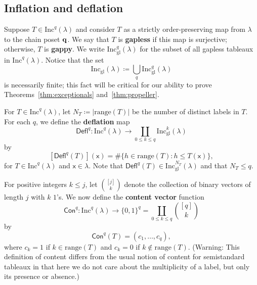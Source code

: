 \documentclass[12pt]{amsart}
\newcommand{\x}{\ensuremath{\mathsf{x}}}
\theoremstyle{definition}
\theoremstyle{remark}
\numberwithin{equation}{section}
\newcommand{\inc}{\ensuremath{\mathrm{Inc}}}
\newcommand{\incgl}{\inc_{\mathrm{gl}}}
\newcommand{\deflate}{\ensuremath{\mathsf{Defl}}}
\newcommand{\content}{\ensuremath{\mathsf{Con}}}
\begin{document}
\subsection{Inflation and deflation}
Suppose $T \in \inc^q(\lambda)$ and consider $T$ as a strictly order-preserving map from $\lambda$ to the chain poset ${\bf q}$. We say that $T$ is {\bf gapless} if this map is surjective; otherwise, $T$ is {\bf gappy}. We write $\incgl^q(\lambda)$ for the subset of all gapless tableaux in $\inc^q(\lambda)$. Notice that the set 
\[
\incgl(\lambda) \coloneqq \bigcup_{q} \incgl^q(\lambda)
\]
is necessarily finite; this fact will be critical for our ability to prove Theorems~\ref{thm:exceptionals} and~\ref{thm:propeller}.

For $T \in \inc^q(\lambda)$, let $N_T \coloneqq |\mathrm{range}(T)|$ be the number of distinct labels in $T$. For each $q$, we define the {\bf deflation} map \[\deflate^q : \inc^q(\lambda) \to \coprod_{0 \leq k \leq q} \incgl^k(\lambda)\] by
\[
[\deflate^q(T)](\x) =
\# \{ h \in \mathrm{range}(T): h \leq T(\x) \} ,
\]
for $T \in \inc^q(\lambda)$ and $\x \in \lambda$. Note that $\deflate^q(T) \in \incgl^{N_T}(\lambda)$ and that $N_T \leq q$.

For positive integers $k \leq j$, let $\binom{[j]}{k}$ denote the collection of binary vectors of length $j$ with $k$ $1$'s. We now define the {\bf content vector} function 
\[
 \content^q : \inc^q(\lambda) \to \{ 0, 1\}^q = \coprod_{0 \leq  k \leq q} \binom{[q]}{k}
 \] 
 by 
\[
\content^q(T) = (c_1, \dots, c_q),
\] 
where $c_k = 1$ if $k \in \mathrm{range}(T)$ and $c_k = 0$ if $k \notin \mathrm{range}(T)$. (Warning: This definition of content differs from the usual notion of content for semistandard tableaux in that here we do not care about the multiplicity of a label, but only its presence or absence.)
\end{document}
